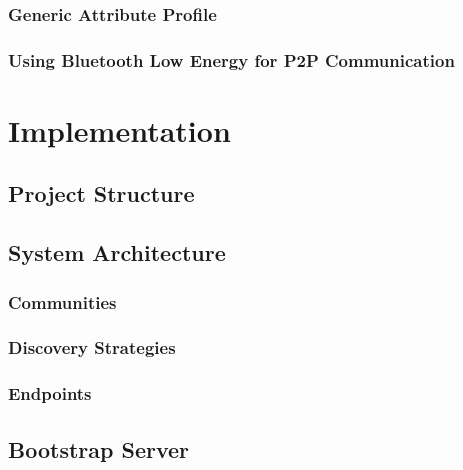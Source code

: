 \subsection{Generic Attribute Profile}

\subsection{Using Bluetooth Low Energy for P2P Communication}


\chapter{Implementation}

\section{Project Structure}


\section{System Architecture}

\subsection{Communities}

\subsection{Discovery Strategies}

\subsection{Endpoints}

\section{Bootstrap Server}


